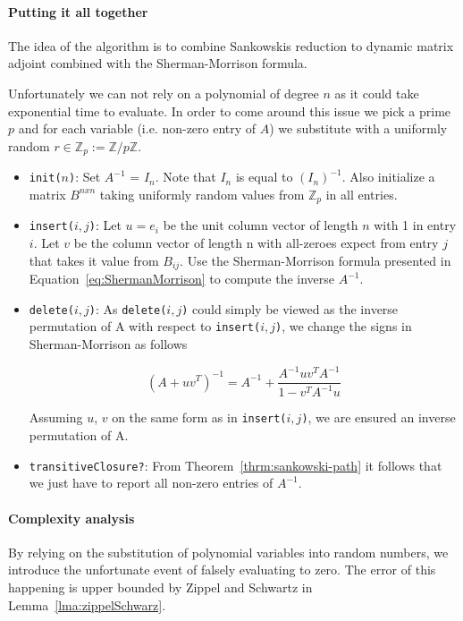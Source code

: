 \documentclass[a4paper,oneside,article,11pt]{memoir}
\begin{document}

\paragraph{Putting it all together}
The idea of the algorithm is to combine Sankowskis reduction to dynamic matrix adjoint combined with the Sherman-Morrison formula.

Unfortunately we can not rely on a polynomial of degree $n$ as it could take exponential time to evaluate. In order to come around this issue we pick a prime $p$ and for each variable (i.e. non-zero entry of $A$) we substitute with a uniformly random $r \in \mathbb{Z}_{p} := \mathbb{Z} / p\mathbb{Z}$.


\begin{itemize}
\item{\texttt{init($n$)}: Set $A^{-1}$ = $I_n$. Note that $I_n$ is equal to $(I_n)^{-1}$. Also  initialize a matrix $B^{nxn}$ taking uniformly random values from $\mathbb{Z}_p$ in all entries.}
\item{\texttt{insert($i,j$)}: Let $u = e_i$ be the unit column vector of length $n$ with 1 in entry $i$. Let $v$ be the column vector of length n with all-zeroes expect from entry $j$ that takes it value from $B_{ij}$.
Use the Sherman-Morrison formula presented in Equation~\ref{eq:ShermanMorrison} to compute the inverse $A^{-1}$.}
\item{\texttt{delete($i,j$)}: As \texttt{delete($i,j$)} could simply be viewed as the inverse permutation of A with respect to \texttt{insert($i,j$)}, we change the signs in Sherman-Morrison as follows

$$(A+uv^T)^{-1} = A^{-1} + \dfrac{A^{-1}uv^TA^{-1}}{1 - v^T A^{-1} u}$$}

Assuming $u$, $v$ on the same form as in \texttt{insert($i,j$)}, we are ensured an inverse permutation of A.

\item{\texttt{transitiveClosure?}: From Theorem~\ref{thrm:sankowski-path} it follows that we just have to report all non-zero entries of $A^{-1}$.}
\end{itemize}

\paragraph{Complexity analysis}

By relying on the substitution of polynomial variables into random numbers, we introduce the unfortunate event of falsely evaluating to zero. The error of this happening is upper bounded by Zippel and Schwartz in Lemma~\ref{lma:zippelSchwarz}.
\end{document}
